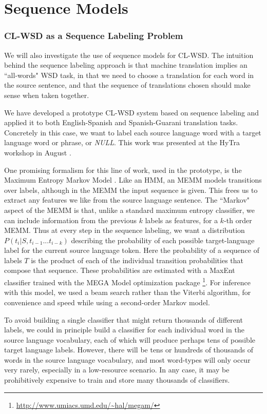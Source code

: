 \chapter{Sequence Models}
\label{chap:sequence}

\subsection{CL-WSD as a Sequence Labeling Problem}
We will also investigate the use of sequence models for CL-WSD.
The intuition behind the sequence labeling approach is that machine translation
implies an ``all-words" WSD task, in that we need to choose a translation for
each word in the source sentence, and that the sequence of translations chosen
should make sense when taken together.

We have developed a prototype CL-WSD system based on sequence labeling and
applied it to both English-Spanish and Spanish-Guarani translation tasks.
Concretely in this case, we want to label each source language word with a
target language word or phrase, or \emph{NULL}.
This work was presented at the HyTra workshop in August
\cite{rudnick-gasser:2013:HyTra-2013}.

One promising formalism for this line of work, used in the prototype, is the
Maximum Entropy Markov Model \cite{icml00/mccallum}.
Like an HMM, an MEMM models transitions over labels, although in the MEMM the
input sequence is given.
This frees us to extract any features we like from the source language
sentence. The ``Markov" aspect of the MEMM is that, unlike a standard maximum
entropy classifier, we can include information from the previous $k$ labels as
features, for a $k$-th order MEMM.
Thus at every step in the sequence labeling, we want a distribution
$P(t_i | S, t_{i-1}...t_{i-k})$ describing the probability of each possible
target-language label for the current source language token.
Here the probability of a sequence of labels $T$ is the product of each of the
individual transition probabilities that compose that sequence.
These probabilities are estimated with a MaxEnt classifier trained with 
the MEGA Model optimization package
\footnote{\url{http://www.umiacs.umd.edu/~hal/megam/}}.
For inference with this model, we used a beam search rather than the Viterbi
algorithm, for convenience and speed while using a second-order Markov model.

To avoid building a single classifier that might return
thousands of different labels, we could in principle build a classifier for
each individual word in the source language vocabulary, each of which will
produce perhaps tens of possible target language labels. However, there will be
tens or hundreds of thousands of words in the source language vocabulary, and
most word-types will only occur very rarely, especially in a low-resource
scenario.
In any case, it may be prohibitively expensive to train and store many
thousands of classifiers.

